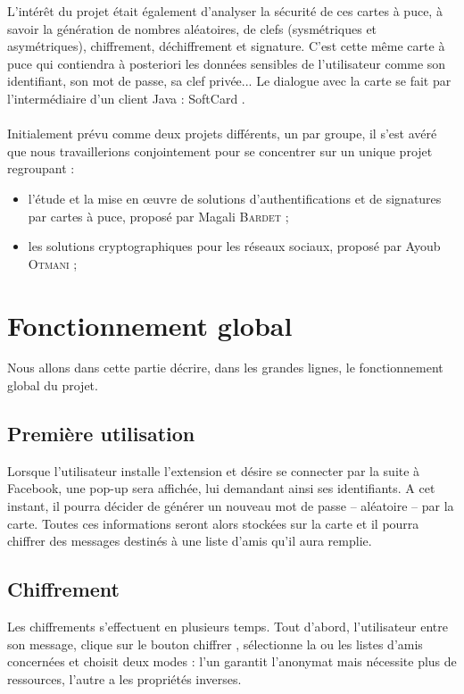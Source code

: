 \documentclass[a4paper,11pt,french]{article}
\begin{document}
L'intérêt du projet était également d'analyser la sécurité de ces cartes à puce,
à savoir la génération de nombres aléatoires, de clefs (sysmétriques et 
asymétriques), chiffrement, déchiffrement et signature. C'est cette même carte
à puce qui contiendra à posteriori les données sensibles de l’utilisateur 
comme son identifiant, son mot de passe, sa clef privée... Le dialogue avec 
la carte se fait par l’intermédiaire d’un client Java : \og{}SoftCard \fg{}. 

\paragraph{}
Initialement prévu comme deux projets différents, un par groupe, il s'est avéré 
que nous travaillerions conjointement pour se concentrer sur un unique projet 
regroupant :
\begin{itemize}
    \item l'étude et la mise en \oe{}uvre de solutions d’authentifications et 
        de signatures par cartes à puce, proposé par Magali \textsc{Bardet} ;
    \item les solutions cryptographiques pour les réseaux sociaux, proposé par Ayoub
        \textsc{Otmani} ;
\end{itemize}

\section{Fonctionnement global}
Nous allons dans cette partie décrire, dans les grandes lignes, le 
fonctionnement global du projet.

\subsection{Première utilisation}
Lorsque l'utilisateur installe l'extension et désire se connecter par la suite à Facebook,
une \og pop-up \fg{} sera affichée, lui demandant ainsi ses identifiants. A cet
instant, il pourra décider de générer un nouveau mot de passe -- aléatoire -- par
la carte. Toutes ces informations seront alors stockées sur la carte et il pourra
chiffrer des messages destinés à une liste d'amis qu'il aura remplie. 

\subsection{Chiffrement}
Les chiffrements s'effectuent en plusieurs temps. Tout d'abord, l'utilisateur 
entre son message, clique sur le bouton \og chiffrer \fg{}, sélectionne la ou les
listes d'amis concernées et choisit deux modes : l'un garantit l'anonymat mais
nécessite plus de ressources, l'autre a les propriétés inverses.
\end{document}

